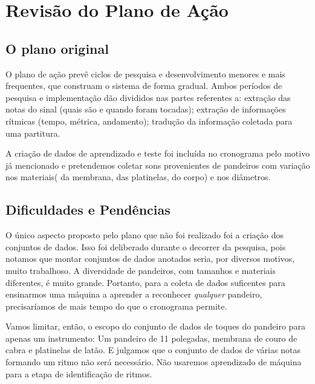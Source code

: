 \documentclass[
  dissertacao,
  brazil
]{ThesisPUC}
\begin{document}
\chapter{Revisão do Plano de Ação}
\section{O plano original}
O plano de ação prevê ciclos de pesquisa e desenvolvimento menores e mais frequentes, que construam o sistema de forma gradual.
Ambos períodos de pesquisa e implementação dão divididos nas partes referentes a: extração das notas do sinal (quais são e quando foram tocadas); extração de informações rítmicas (tempo, métrica, andamento); tradução da informação coletada para uma partitura.

A criação de dados de aprendizado e teste foi incluída no cronograma pelo motivo já mencionado e pretendemos coletar sons provenientes de pandeiros com variação nos materiais( da membrana, das platinelas, do corpo) e nos diâmetros.


\section{Dificuldades e Pendências}

O único aspecto proposto pelo plano que não foi realizado foi a criação dos conjuntos de dados.
Isso foi deliberado durante o decorrer da pesquisa, pois notamos que montar conjuntos de dados anotados seria, por diversos motivos, muito trabalhoso.
A diversidade de pandeiros, com tamanhos e materiais diferentes, é muito grande. 
Portanto, para a coleta de dados suficentes para ensinarmos uma máquina a aprender a reconhecer \emph{qualquer} pandeiro, precisaríamos de mais tempo do que o cronograma permite. 

Vamos limitar, então, o escopo do conjunto de dados de toques do pandeiro para apenas um instrumento: Um pandeiro de 11 polegadas, membrana de couro de cabra e platinelas de latão.
E julgamos que o conjunto de dados de várias notas formando um ritmo não será necessário. Não usaremos aprendizado de máquina para a etapa de identificação de ritmos.

\cronogramaoriginal
%

\cronogramanovo
%

\arial

\normalfont
\end{document}
